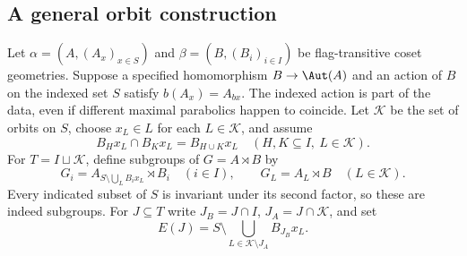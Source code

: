 \subsection{A general orbit construction}
Let $\alpha=(A,(A_x)_{x\in S})$ and
$\beta=(B,(B_i)_{i\in I})$ be flag-transitive coset geometries.
Suppose a specified homomorphism $B\to\Aut(A)$ and an action of $B$
on the indexed set $S$ satisfy $b(A_x)=A_{bx}$.
The indexed action is part of the data, even if different maximal
parabolics happen to coincide. Let $\mathcal K$ be the set of orbits
on $S$, choose $x_L\in L$ for each $L\in\mathcal K$, and assume
\begin{equation}\label{O-eq:general-orbits}
 B_Hx_L\cap B_Kx_L=B_{H\cup K}x_L
 \quad(H,K\subseteq I,\ L\in\mathcal K).
\end{equation}
For $T=I\sqcup\mathcal K$, define subgroups of $G=A\rtimes B$ by
\begin{equation}\label{O-eq:general-maximal}
 G_i=A_{S\setminus\bigcup_L B_ix_L}\rtimes B_i\quad(i\in I),
 \qquad G_L=A_L\rtimes B\quad(L\in\mathcal K).
\end{equation}
Every indicated subset of $S$ is invariant under its second factor,
so these are indeed subgroups. For $J\subseteq T$ write
$J_B=J\cap I$, $J_A=J\cap\mathcal K$, and set
\[
 E(J)=S\setminus\bigcup_{L\in\mathcal K\setminus J_A}B_{J_B}x_L.
\]

